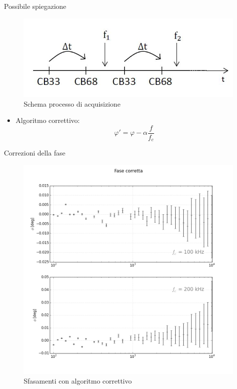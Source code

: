\documentclass{beamer}
\begin{document}
\begin{frame}{Possibile spiegazione}
\begin{figure}
\centering
\includegraphics[width=0.7\linewidth]{immagine}
\caption{Schema processo di acquisizione}
\label{fig:schema}
\end{figure}
\begin{itemize}

\begin{definition}
$\Delta \varphi = \Delta t \, f$, $\Delta t = \frac{\alpha}{f_c}$, $\alpha = 179.97 \pm 0.11$
\end{definition}

\item Algoritmo correttivo:\\
\begin{equation}
\varphi ' = \varphi - \alpha \frac{f}{f_c}
\end{equation}
\end{itemize}
\end{frame}

\begin{frame}{Correzioni della fase}
\begin{figure}
\includegraphics[width=0.6\linewidth]{subplots_errors}
\caption{Sfasamenti con algoritmo correttivo}
\label{fig:sfasacorret}
\end{figure}
\end{frame}
\end{document}
